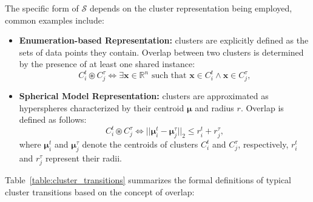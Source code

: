 The specific form of $\mathcal{S}$ depends on the cluster representation being
employed, common examples include:

\begin{itemize}
    \item \textbf{Enumeration-based Representation:} clusters are explicitly
          defined as the sets of data points they contain. Overlap between two
          clusters is determined by the presence of at least one shared instance:
          \begin{equation}
              C_i^t \circledast C_j^\tau \iff \exists \mathbf{x} \in \mathbb{R}^n \text{ such that } \mathbf{x} \in C_i^t \land \mathbf{x} \in C_j^\tau,
          \end{equation}

    \item \textbf{Spherical Model Representation:} clusters are approximated as hyperspheres characterized by their centroid $\boldsymbol{\mu}$ and radius $r$. Overlap is defined as follows:
          \begin{equation}
              C_i^t \circledast C_j^\tau \iff ||\boldsymbol{\mu}_i^t - \boldsymbol{\mu}_j^\tau||_2 \leq r_i^t + r_j^\tau,
          \end{equation}
          where $\boldsymbol{\mu}_i^t$ and $\boldsymbol{\mu}_j^\tau$ denote the centroids of clusters $C_i^t$ and $C_j^\tau$, respectively, $r_i^t$ and $r_j^\tau$ represent their radii.
\end{itemize}

Table~\ref{table:cluster_transitions} summarizes the formal definitions of typical cluster
transitions based on the concept of overlap:

